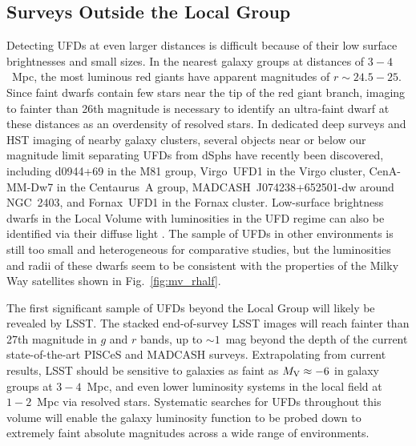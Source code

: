 \documentclass[a4paper]{ar-1col}
\begin{document}
\subsection{Surveys Outside the Local Group}

Detecting UFDs at even larger distances is difficult because of their
low surface brightnesses and small sizes.  In the nearest galaxy
groups at distances of $3-4$~Mpc, the most luminous red giants have
apparent magnitudes of $r \sim 24.5-25$.  Since faint dwarfs contain
few stars near the tip of the red giant branch, imaging to fainter
than 26th magnitude is necessary to identify an ultra-faint dwarf at
these distances as an overdensity of resolved stars.  In dedicated
deep surveys and HST imaging of nearby galaxy clusters, several
objects near or below our magnitude limit separating UFDs from dSphs
have recently been discovered, including d0944+69 \citep[$M_{{\rm V}}
  = -6.4$;][]{chiboucas09,chiboucas13} in the M81 group, Virgo~UFD1
\citep[$M_{{\rm V}} = -6.5$;][]{jl14} in the Virgo cluster,
CenA-MM-Dw7 \citep[$M_{{\rm V}} = -7.2$;][]{crnojevic16} in the
Centaurus~A group, MADCASH~J074238+652501-dw \citep[$M_{{\rm V}} =
  -7.7$][]{carlin16} around NGC~2403, and Fornax~UFD1 \citep[$M_{{\rm
      V}} = -7.6$;][]{lee17} in the Fornax cluster.  Low-surface
brightness dwarfs in the Local Volume with luminosities in the UFD
regime can also be identified via their diffuse light
\citep[e.g.,][]{bennet17,danieli18}.  The sample of UFDs in other
environments is still too small and heterogeneous for comparative
studies, but the luminosities and radii of these dwarfs seem to be
consistent with the properties of the Milky Way satellites shown in
Fig.~\ref{fig:mv_rhalf}.

The first significant sample of UFDs beyond the Local Group will
likely be revealed by LSST.  The stacked end-of-survey LSST images
will reach fainter than 27th magnitude in $g$ and $r$ bands, up to
$\sim1$~mag beyond the depth of the current state-of-the-art PISCeS
\citep[e.g.,][]{sand14,crnojevic16} and MADCASH \citep{carlin16}
surveys.  Extrapolating from current results, LSST should be sensitive
to galaxies as faint as $M_{{\rm V}} \approx -6$ in galaxy groups at
$3-4$~Mpc, and even lower luminosity systems in the local field at
$1-2$~Mpc \citep[e.g.,][]{tollerud08,lsstscibook} via resolved stars.
Systematic searches for UFDs throughout this volume will enable the
galaxy luminosity function to be probed down to extremely faint
absolute magnitudes across a wide range of environments.
\end{document}
